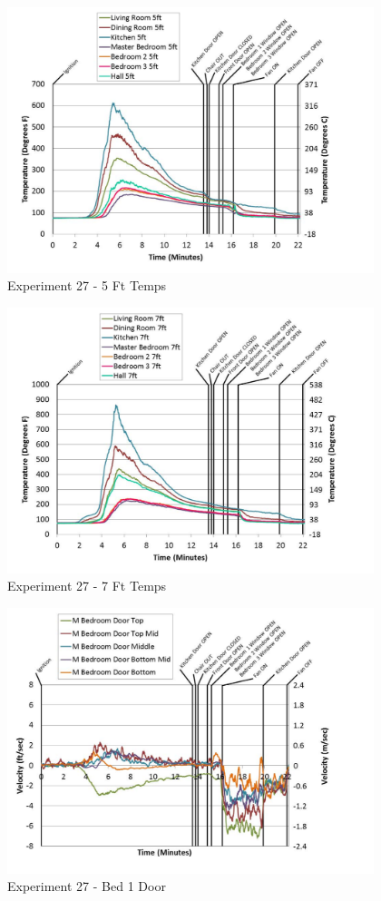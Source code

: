 \documentclass{article}
\begin{document}
\begin{appendices}
	\begin{figure}[h!]
		\centering
		\includegraphics[height=3.05in]{0_Images/Results_Charts/Exp_27_Charts/5FtTemps.pdf}
		\caption{Experiment 27 - 5 Ft Temps}
	\end{figure}
 

	\begin{figure}[h!]
		\centering
		\includegraphics[height=3.05in]{0_Images/Results_Charts/Exp_27_Charts/7FtTemps.pdf}
		\caption{Experiment 27 - 7 Ft Temps}
	\end{figure}
 
	\clearpage

	\begin{figure}[h!]
		\centering
		\includegraphics[height=3.05in]{0_Images/Results_Charts/Exp_27_Charts/Bed1Door.pdf}
		\caption{Experiment 27 - Bed 1 Door}
	\end{figure}
 


\end{appendices}
\end{document}
